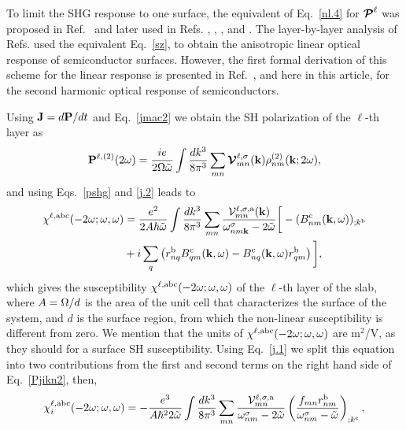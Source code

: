 \documentclass[floatfix,prb,aps,superscriptaddress,11pt,preprint,letterpaper]{revtex4}
\begin{document}
To limit the SHG response to one surface, the equivalent of Eq.~\eqref{nl.4} 
for $\boldsymbol{\mathcal{\cal P}}^\ell$ was proposed in 
Ref.~ and later used in Refs.
,
,
,
 and . 
The layer-by-layer analysis of Refs.  
used the equivalent Eq.~\eqref{sz}, 
to obtain the
anisotropic linear optical response of semiconductor surfaces.
However, the first formal derivation
of this scheme 
for the linear response 
is presented in
Ref.~, 
and here in this 
article, for the second harmonic optical response of semiconductors.

Using
$\mathbf{J}=d\mathbf{P}/dt$ 
and Eq.~\eqref{jmac2} 
we obtain the SH polarization of the $\ell$-th layer as
\begin{equation}\label{Pjikn}
\mathbf{P}^{\ell,(2)}(2\omega)
=\frac{ie}{2\Omega\tilde\omega}
\int \frac{dk^3}{8\pi^3}
\sum_{mn}
\boldsymbol{\mathcal{\cal V}}^{\ell,\sigma}_{mn}(\mathbf{k})
\rho^{(2)}_{nm}(\mathbf{k};2\omega)
,
\end{equation}
and using Eqs.~\eqref{pshg} and \eqref{j.2} 
leads to
\begin{align}\label{Pjikn2}
\chi^{\ell,\mathrm{a}\mathrm{b}\mathrm{c}}(-2\omega;\omega,\omega) 
&=
\frac{e^2}{2A\hbar\tilde\omega}
\int \frac{dk^3}{8\pi^3}
\sum_{mn}
\frac{{\mathbf{\cal V}}^{\ell,\sigma,\mathrm{a}}_{mn}(\mathbf{k})}
{\omega^\sigma_{nm\mathbf{k}}-2\tilde\omega}
\bigg[
-(B_{nm}^{\mathrm{c}}(\mathbf{k},\omega))_{;k^{\mathrm{b}}}
\nonumber \\
&
+i\sum_q\left(r_{nq}^{\mathrm{b}}B_{qm}^{\mathrm{c}}(\mathbf{k},\omega) -
  B_{nq}^{\mathrm{c}}(\mathbf{k},\omega) 
  r_{qm}^{\mathrm{b}}\right)
\bigg]
,
\end{align}
which gives the susceptibility 
$\chi^{\ell,\mathrm{a}\mathrm{b}\mathrm{c}}(-2\omega;\omega,\omega)$ 
of the $\ell$-th layer of the slab, 
where $A=\Omega/d$ is the area of the unit
cell that characterizes the surface of the system, and $d$
is the surface region, from which the non-linear susceptibility is different from zero.
We mention that the units of 
$\chi^{\ell,\mathrm{a}\mathrm{b}\mathrm{c}}(-2\omega;\omega,\omega)$
are m$^2$/V, as they should for a surface SH susceptibility.
Using Eq.~\eqref{j.1} we
split this equation into
two contributions from the first and second terms on the right hand side
of Eq.~\eqref{Pjikn2}, then,
\begin{equation}\label{chii}
\chi^{\ell,\mathrm{a}\mathrm{b}\mathrm{c}}_i (-2\omega;\omega,\omega)
=-\frac{e^3}{A\hbar^22\tilde\omega}
\int \frac{dk^3}{8\pi^3}
\sum_{mn}
\frac{{\mathbf{\cal V}}_{mn}^{\ell,\sigma,\mathrm{a}}}{\omega^\sigma_{nm}-2\tilde\omega}
\left(\frac{f_{mn}r_{nm}^{\mathrm{b}}}{\omega^\sigma_{nm}-\tilde\omega}\right)_{;k^{\mathrm{c}}}
,
\end{equation} 
\end{document}
